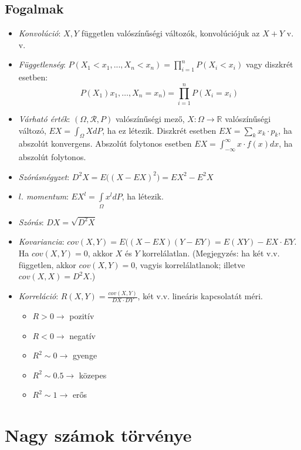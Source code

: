 \documentclass[tikz,12pt,margin=0px]{article}
\newcommand\ddfrac[2]{\frac{\displaystyle #1}{\displaystyle #2}}
\begin{document}
	\subsection*{Fogalmak}
	
	\begin{itemize}
		\item \textit{Konvolúció}: $X,Y$ független valószínűségi változók, konvolúciójuk az $X+Y$ v. v.
		\item \textit{Függetlenség}: $P(X_1<x_1, ..., X_n<x_n) = \prod\limits_{i=1}^{n}{P(X_i<x_i)}$ vagy diszkrét esetben:
        \[
            P(X_1)x_1, \ldots, X_n=x_n) = \prod_{i=1}^{n}{P(X_i=x_i)}
        \]
        \item \textit{Várható érték}: $(\Omega, \mathcal{R}, P)$ valószínűségi mező, $X:\Omega \to \mathbb{R}$ valószínűségi változó, $EX = \int_{\Omega}{XdP}$, ha ez létezik. Diszkrét esetben $EX = \sum_{k}{x_k \cdot p_k}$, ha abszolút konvergens. Abszolút folytonos esetben $EX = \int_{-\infty}^{\infty}{x \cdot f(x)dx}$, ha abszolút folytonos.
		\item \textit{Szórásnégyzet}: $D^{2}X = E\big((X-EX)^2\big) = EX^2-E^{2}X$
		\item \textit{$l.$ momentum}: $EX^l = \int\limits_{\Omega}{x^{l}dP}$, ha létezik.
		\item \textit{Szórás}: $DX = \sqrt{D^{2}X}$
		\item \textit{Kovariancia}: $cov(X,Y) = E((X-EX)(Y-EY) = E(XY) - EX \cdot EY$. Ha $cov(X,Y) = 0$, akkor $X$ és $Y$ korrelálatlan. (Megjegyzés: ha két v.v. független, akkor $cov(X,Y) = 0$, vagyis korrelálatlanok; illetve $cov(X,X) = D^{2}X$.)
		\item \textit{Korreláció}: $R(X,Y) = \ddfrac{cov(X,Y)}{DX \cdot DY}$, két v.v. lineáris kapcsolatát méri. 
        \begin{itemize}
            \item $R > 0 \to$ pozitív 
            \item $R < 0 \to$ negatív 
            \item $R^2 \sim 0 \to$ gyenge
            \item $R^2 \sim 0.5 \to$ közepes
            \item $R^2 \sim 1 \to$ erős
        \end{itemize}
	\end{itemize}
	
	\section*{Nagy számok törvénye}
	
\end{document}
